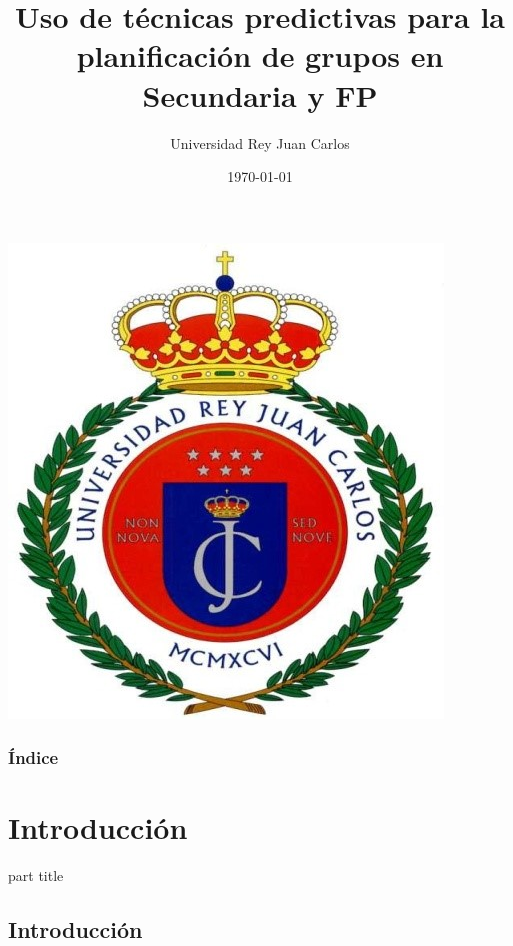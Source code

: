 \documentclass{beamer}
\title{Uso de técnicas predictivas para la planificación de grupos en Secundaria y FP}
\author{Universidad Rey Juan Carlos}
\institute{\textbf {Autor: Abel de Andrés Gómez\\ Tutor: Aurelio Berges García}} %
\date{{\small \today}}
\begin{document}

\begin{frame}[plain]{}
\begin{center}
\includegraphics [width =0.3 \textwidth ]{figures/escudo_urjc} %
\vspace*{-5mm}

\end{center}

\titlepage
\end{frame}

\begin{frame}
\frametitle{Índice} %
\begin{multicols}{2}
	\tableofcontents
\end{multicols}
\end{frame}






\section{Introducción} %
\begin{frame}
\begin{center}
	\begin{beamercolorbox}[
		sep=8pt,center,rounded=true,shadow=true]{part title}
		\secname
	\end{beamercolorbox}
\end{center}
\end{frame}

\subsection{Introducción} %
\end{document}
